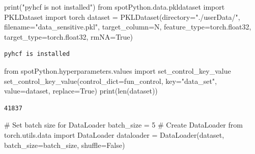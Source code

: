 \documentclass[
  letterpaper,
  DIV=11,
  numbers=noendperiod]{scrreprt}
\newenvironment{Shaded}{\begin{snugshade}}{\end{snugshade}}
\newcommand{\BuiltInTok}[1]{\textcolor[rgb]{0.00,0.23,0.31}{#1}}
\newcommand{\CommentTok}[1]{\textcolor[rgb]{0.37,0.37,0.37}{#1}}
\newcommand{\DecValTok}[1]{\textcolor[rgb]{0.68,0.00,0.00}{#1}}
\newcommand{\ImportTok}[1]{\textcolor[rgb]{0.00,0.46,0.62}{#1}}
\newcommand{\NormalTok}[1]{\textcolor[rgb]{0.00,0.23,0.31}{#1}}
\newcommand{\OperatorTok}[1]{\textcolor[rgb]{0.37,0.37,0.37}{#1}}
\newcommand{\StringTok}[1]{\textcolor[rgb]{0.13,0.47,0.30}{#1}}
\newcommand{\VariableTok}[1]{\textcolor[rgb]{0.07,0.07,0.07}{#1}}
\begin{document}
\begin{tcolorbox}
\begin{Shaded}
\begin{Highlighting}[]
    \BuiltInTok{print}\NormalTok{(}\StringTok{"pyhcf is not installed"}\NormalTok{)}
    \ImportTok{from}\NormalTok{ spotPython.data.pkldataset }\ImportTok{import}\NormalTok{ PKLDataset}
    \ImportTok{import}\NormalTok{ torch}
\NormalTok{    dataset }\OperatorTok{=}\NormalTok{ PKLDataset(directory}\OperatorTok{=}\StringTok{"./userData/"}\NormalTok{,}
\NormalTok{                        filename}\OperatorTok{=}\StringTok{"data\_sensitive.pkl"}\NormalTok{,}
\NormalTok{                        target\_column}\OperatorTok{=}\StringTok{\textquotesingle{}N\textquotesingle{}}\NormalTok{,}
\NormalTok{                        feature\_type}\OperatorTok{=}\NormalTok{torch.float32,}
\NormalTok{                        target\_type}\OperatorTok{=}\NormalTok{torch.float32,}
\NormalTok{                        rmNA}\OperatorTok{=}\VariableTok{True}\NormalTok{)}
\end{Highlighting}
\end{Shaded}

\begin{verbatim}
pyhcf is installed
\end{verbatim}

\begin{Shaded}
\begin{Highlighting}[]
\ImportTok{from}\NormalTok{ spotPython.hyperparameters.values }\ImportTok{import}\NormalTok{ set\_control\_key\_value}
\NormalTok{set\_control\_key\_value(control\_dict}\OperatorTok{=}\NormalTok{fun\_control,}
\NormalTok{                        key}\OperatorTok{=}\StringTok{"data\_set"}\NormalTok{,}
\NormalTok{                        value}\OperatorTok{=}\NormalTok{dataset,}
\NormalTok{                        replace}\OperatorTok{=}\VariableTok{True}\NormalTok{)}
\BuiltInTok{print}\NormalTok{(}\BuiltInTok{len}\NormalTok{(dataset))}
\end{Highlighting}
\end{Shaded}

\begin{verbatim}
41837
\end{verbatim}

\begin{Shaded}
\begin{Highlighting}[]
\CommentTok{\# Set batch size for DataLoader}
\NormalTok{batch\_size }\OperatorTok{=} \DecValTok{5}
\CommentTok{\# Create DataLoader}
\ImportTok{from}\NormalTok{ torch.utils.data }\ImportTok{import}\NormalTok{ DataLoader}
\NormalTok{dataloader }\OperatorTok{=}\NormalTok{ DataLoader(dataset, batch\_size}\OperatorTok{=}\NormalTok{batch\_size, shuffle}\OperatorTok{=}\VariableTok{False}\NormalTok{)}
 

\end{Highlighting}
\end{Shaded}
\end{tcolorbox}
\end{document}
